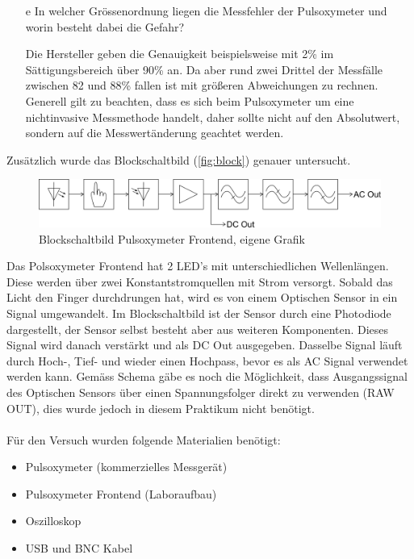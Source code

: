 \documentclass[11pt]{scrartcl}
\begin{document}
\begin{itemize}
\begin{equation}
        \end{equation}
        \item[e] In welcher Grössenordnung liegen die Messfehler der Pulsoxymeter und worin
        besteht dabei die Gefahr? 
        \item[] Die Hersteller geben die Genauigkeit beispielsweise mit 2\% im Sättigungsbereich über 90\% an.
        Da aber rund zwei Drittel der Messfälle zwischen 82 und 88\% fallen ist mit größeren Abweichungen zu rechnen. 
        Generell gilt zu beachten, dass es sich beim Pulsoxymeter um eine nichtinvasive Messmethode handelt,
        daher sollte nicht auf den Absolutwert, sondern auf die Messwertänderung geachtet werden.
    \end{itemize}

    Zusätzlich wurde das Blockschaltbild (\autoref{fig:block}) genauer untersucht.

    \begin{figure}[H]
        \centering
        \includegraphics[width=15cm]{../images/Blockschaltbild}
        \caption{Blockschaltbild Pulsoxymeter Frontend, eigene Grafik}
        \label{fig:block}
    \end{figure}

    Das Polsoxymeter Frontend hat 2 LED's mit unterschiedlichen Wellenlängen.
    Diese werden über zwei Konstantstromquellen mit Strom versorgt.
    Sobald das Licht den Finger durchdrungen hat, wird es von einem Optischen Sensor in ein Signal umgewandelt.
    Im Blockschaltbild ist der Sensor durch eine Photodiode dargestellt, der Sensor selbst besteht aber aus weiteren Komponenten.
    Dieses Signal wird danach verstärkt und als DC Out ausgegeben.
    Dasselbe Signal läuft durch Hoch-, Tief- und wieder einen Hochpass, bevor es als AC Signal verwendet werden kann.
    Gemäss Schema gäbe es noch die Möglichkeit, dass Ausgangssignal des Optischen Sensors über einen Spannungsfolger direkt zu verwenden (RAW OUT), dies wurde jedoch in diesem Praktikum nicht benötigt.
    \\\\

    Für den Versuch wurden folgende Materialien benötigt:

    \begin{itemize}
        \item  Pulsoxymeter (kommerzielles Messgerät)
        \item Pulsoxymeter Frontend (Laboraufbau)
        \item Oszilloskop
        \item USB und BNC Kabel 
        
    \end{itemize}
\end{document}
